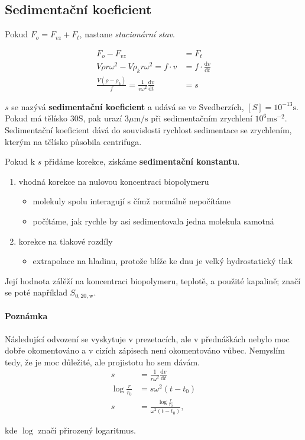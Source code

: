 \documentclass[DIV=8]{scrreprt}
\newcommand{\mybox}[2]{
    \paragraph{#1} #2
}
\begin{document}
\subsection{Sedimentační koeficient} \label{Sedimentační koeficient}


Pokud \(F_o = F_{vz} + F_t\), nastane \emph{stacionární stav}.

\begin{align*}F_o - F_{vz} &= F_t \\
V \rho r  \omega^2 - V  \rho_k  r  \omega^2 = f \cdot v &= f \cdot \frac{\text{d}v}{\text{d}t} \\
\frac{V (\rho - \rho_k)}{f} = \frac{1}{r \omega^2} \frac{\text{d}v}{\text{d}t} &= s\end{align*}


\(s\) se nazývá \textbf{sedimentační koeficient} a udává se ve Svedberzích, \([S] = 10^{-13}\text{s}\). Pokud má tělísko 30S, pak urazí 3\(\mu \text{m}/\text{s}\) při sedimentačním zrychlení \(10^6 \text{ms}^{-2}\). Sedimentační koeficient dává do souvislosti rychlost sedimentace se zrychlením, kterým na tělísko působila centrifuga.

Pokud k \(s\) přidáme korekce, získáme \textbf{sedimentační konstantu}.
\begin{enumerate}[nosep]
    \item vhodná korekce na nulovou koncentraci biopolymeru
\begin{itemize}[nosep]
    \item molekuly spolu interagují s čímž normálně nepočítáme
    \item počítáme, jak rychle by asi sedimentovala jedna molekula samotná
\end{itemize}

    \item korekce na tlakové rozdíly
\begin{itemize}[nosep]
    \item extrapolace na hladinu, protože blíže ke dnu je velký hydrostatický tlak
\end{itemize}

\end{enumerate}


Její hodnota zálěží na koncentraci biopolymeru, teplotě, a použité kapalině; značí se poté například \(S_{0, 20, \text{w}}\).

\mybox{Poznámka}{Následující odvození se vyskytuje v prezetacích, ale v přednáškách nebylo moc dobře okomentováno a v cizích zápisech není okomentováno vůbec. Nemyslím tedy, že je moc důležité, ale projistotu ho sem dávám.
\begin{align*}s &= \frac{1}{r \omega^2} \frac{\text{d}v}{\text{d}t} \\
\log \frac{r}{r_0} &= s \omega^2 (t - t_0) \\
s & = \frac{\log \frac{r}{r_0}}{\omega^2 (t - t_0)},\end{align*}

kde \(\log\) značí přirozený logaritmus.}
\end{document}
